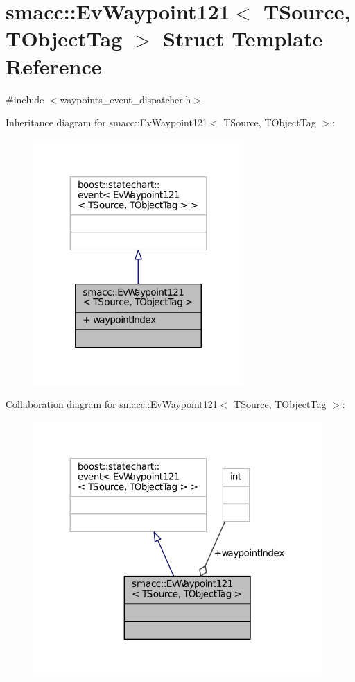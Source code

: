 \hypertarget{structsmacc_1_1EvWaypoint121}{}\section{smacc\+:\+:Ev\+Waypoint121$<$ T\+Source, T\+Object\+Tag $>$ Struct Template Reference}
\label{structsmacc_1_1EvWaypoint121}


{\ttfamily \#include $<$waypoints\+\_\+event\+\_\+dispatcher.\+h$>$}



Inheritance diagram for smacc\+:\+:Ev\+Waypoint121$<$ T\+Source, T\+Object\+Tag $>$\+:
\nopagebreak
\begin{figure}[H]
\begin{center}
\leavevmode
\includegraphics[width=227pt]{structsmacc_1_1EvWaypoint121__inherit__graph}
\end{center}
\end{figure}


Collaboration diagram for smacc\+:\+:Ev\+Waypoint121$<$ T\+Source, T\+Object\+Tag $>$\+:
\nopagebreak
\begin{figure}[H]
\begin{center}
\leavevmode
\includegraphics[width=312pt]{structsmacc_1_1EvWaypoint121__coll__graph}
\end{center}
\end{figure}
